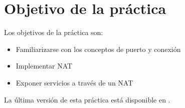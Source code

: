 
\usepackage{eurosym}


\renewcommand{\hmwkClass}{Planificación y Administración de Redes}
\renewcommand{\hmwkTitle}{Práctica de conexiones TCP}









\primerapagina

\setlength{\parindent}{0em}
\setlength{\parskip}{1em}


\section{Objetivo de la práctica}
Los objetivos  de la práctica son:
\begin{itemize}
\item Familiarizarse con los conceptos de puerto y conexión
\item Implementar NAT
\item Exponer servicios a través de un NAT
\end{itemize}


La última versión de esta práctica está disponible en .


